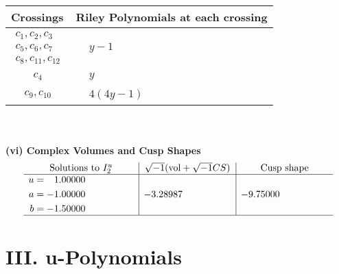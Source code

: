 \documentclass[1p]{elsarticle_modified}
\theoremstyle{definition}
\newcommand{\I}{\sqrt{-1}}
\begin{document}
\begin{tabular}{m{50pt}|m{274pt}}
Crossings & \hspace{64pt}Riley Polynomials at each crossing \\
\hline $$\begin{aligned}c_{1},c_{2},c_{3}\\c_{5},c_{6},c_{7}\\c_{8},c_{11},c_{12}\end{aligned}$$&$\begin{aligned}
&y-1
\end{aligned}$\\
\hline $$\begin{aligned}c_{4}\end{aligned}$$&$\begin{aligned}
&y
\end{aligned}$\\
\hline $$\begin{aligned}c_{9},c_{10}\end{aligned}$$&$\begin{aligned}
&4(4 y-1)
\end{aligned}$\\
\hline
\end{tabular}\\~\\
\newpage\flushleft \textbf{(vi) Complex Volumes and Cusp Shapes}
$$\begin{array}{c|c|c}  
\text{Solutions to }I^u_{2}& \I (\text{vol} + \sqrt{-1}CS) & \text{Cusp shape}\\
 \hline 
\begin{aligned}
u &= \phantom{-}1.00000\phantom{ +0.000000I} \\
a &= -1.00000\phantom{ +0.000000I} \\
b &= -1.50000\phantom{ +0.000000I}\end{aligned}
 & -3.28987\phantom{ +0.000000I} & -9.75000\phantom{ +0.000000I}\\
 \hline 
 \end{array}$$\newpage
\newpage\renewcommand{\arraystretch}{1}
\centering \section*{ III. u-Polynomials}
\end{document}
